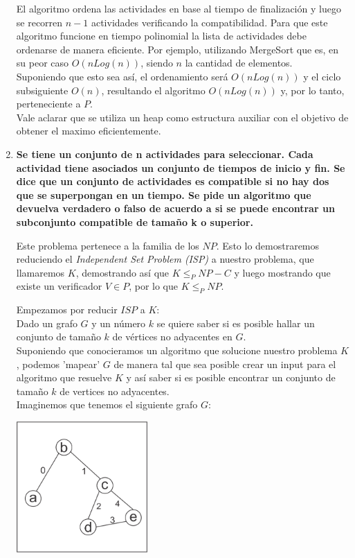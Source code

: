 \documentclass{article}
\newcommand\tab[1][0.5cm]{\hspace*{#1}}
\begin{document}
\begin{enumerate}
            \tab El algoritmo ordena las actividades en base al tiempo de finalización y luego se recorren $n-1$
            actividades verificando la compatibilidad.
            \tab Para que este algoritmo funcione en tiempo polinomial la lista de actividades debe ordenarse
            de manera eficiente. Por ejemplo, utilizando MergeSort que es, en su peor caso $O(n Log(n))$, siendo
            $n$ la cantidad de elementos.\\
            \tab Suponiendo que esto sea así, el ordenamiento será $O(n Log(n))$ y el ciclo subsiguiente $O(n)$,
            resultando el algoritmo $O(n Log(n))$ y, por lo tanto, perteneciente a $P$.\\
            \tab Vale aclarar que se utiliza un heap como estructura auxiliar con el objetivo de obtener el maximo eficientemente.

        \item \textbf{Se tiene un conjunto de n actividades para seleccionar. Cada actividad tiene asociados un conjunto de
            tiempos de inicio y fin. Se dice que un conjunto de actividades es compatible si no hay dos que se
            superpongan en un tiempo. Se pide un algoritmo que devuelva verdadero o falso de acuerdo a si se
            puede encontrar un subconjunto compatible de tamaño k o superior.} %

            \tab Este problema pertenece a la familia de los $NP$. Esto lo demostraremos reduciendo el
            \emph{Independent Set Problem (ISP)} a nuestro problema, que llamaremos $K$, demostrando
            así que $K \leq_{P} NP-C$ y luego mostrando que existe un verificador $V \in P$, por lo
            que $K \leq_{P} NP$.

            \tab Empezamos por reducir $ISP$ a $K$:\\
            \tab Dado un grafo $G$ y un número $k$ se quiere saber si es posible hallar un conjunto de tamaño $k$
            de vértices no adyacentes en $G$. \\
            \tab Suponiendo que conocieramos un algoritmo que solucione nuestro problema $K$, podemos 'mapear' $G$
            de manera tal que sea posible crear un input para el algoritmo que resuelve $K$ y así saber si es posible
            encontrar un conjunto de tamaño $k$ de vertices no adyacentes. \\
            \tab Imaginemos que tenemos el siguiente grafo $G$:

            \begin{center}
                \includegraphics[width=5cm, height=5cm]{images/p2init} %
            \end{center}


\end{enumerate}
\end{document}
